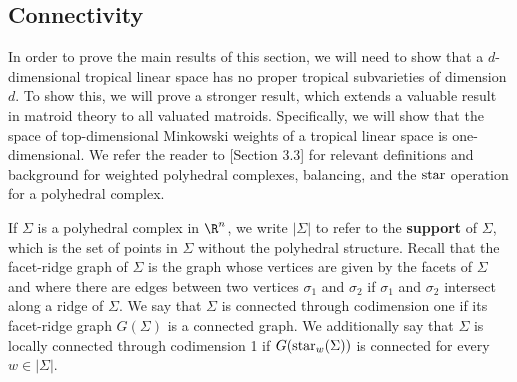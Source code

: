 \subsection{Connectivity}\label{subsec:connectivity}
 In order to prove the main results of this section, we will need to show that a $d$-dimensional tropical linear space has no proper tropical subvarieties of dimension $d$. To show this, we will prove a stronger result, which extends a valuable result in matroid theory to all valuated matroids. Specifically, we will show that the space of top-dimensional Minkowski weights of a tropical linear space is one-dimensional. We refer the reader to \cite{MS15}[Section 3.3] for relevant definitions and background for weighted polyhedral complexes, balancing, and the $\operatorname{star}$ operation for a polyhedral complex.
 

If $\Sigma$ is a polyhedral complex in $\R^n$, we write $|\Sigma|$ to refer to the \textbf{support} of $\Sigma$, which is the set of points in $\Sigma$ without the polyhedral structure. Recall that the facet-ridge graph of $\Sigma$ is the graph whose vertices are given by the facets of $\Sigma$ and where there are edges between two vertices $\sigma_1$ and $\sigma_2$ if $\sigma_1$ and $\sigma_2$ intersect along a ridge of $\Sigma$. We say that $\Sigma$  is connected through codimension one if its facet-ridge graph $G(\Sigma)$ is a connected graph. We additionally say that $\Sigma$ is locally connected through codimension 1 if $G(\operatorname{star}_w(\Sigma))$ is connected for every $w\in |\Sigma|$. 


